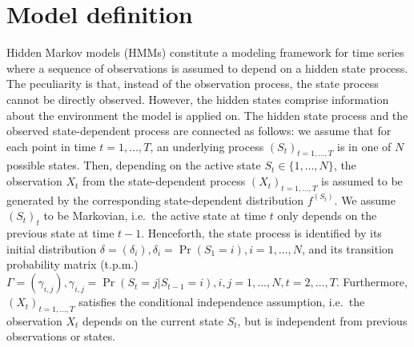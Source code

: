 \documentclass[article]{jss}
\begin{document}

\section{Model definition} \label{sec:model_definition} %

Hidden Markov models (HMMs) constitute a modeling framework for time series where a sequence of observations is assumed to depend on a hidden state process. The peculiarity is that, instead of the observation process, the state process cannot be directly observed. However, the hidden states comprise information about the environment the model is applied on. The hidden state process and the observed state-dependent process are connected as follows: we assume that for each point in time $t = 1, \ldots, T$, an underlying process $(S_t)_{t = 1, \ldots, T}$ is in one of $N$ possible states. Then, depending on the active state $S_t \in \{ 1, \ldots, N \}$, the observation $X_t$ from the state-dependent process $(X_t)_{t = 1, \ldots, T}$ is assumed to be generated by the corresponding state-dependent distribution $f^{(S_t)}$. We assume $(S_t)_t$ to be Markovian, i.e.\ the active state at time $t$ only depends on the previous state at time $t-1$. Henceforth, the state process is identified by its initial distribution $\delta = (\delta_i), \delta_i = \Pr(S_1 = i), i = 1, \ldots, N$, and its transition probability matrix (t.p.m.) $\Gamma = (\gamma_{i,j}), \gamma_{i,j} = \Pr(S_{t} = j|S_{t-1}=i), i,j = 1, \ldots, N, t = 2, \ldots, T$. Furthermore, $(X_t)_{t = 1, \ldots, T}$ satisfies the conditional independence assumption, i.e.\ the observation $X_t$ depends on the current state $S_t$, but is independent from previous observations or states.
\end{document}
